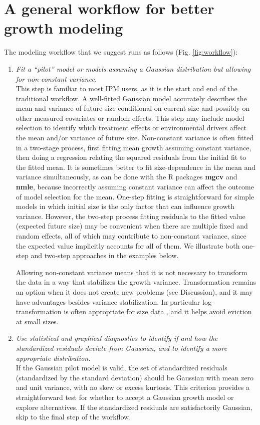 \documentclass[12pt]{article}
\begin{document}
\section*{A general workflow for better growth modeling}
The modeling workflow that we suggest runs as follows (Fig. \ref{fig:workflow}):
\begin{enumerate}[label=\arabic*., listparindent=1.5em]
\item \textit{Fit a ``pilot'' model or models assuming a Gaussian distribution but allowing for non-constant variance.}
\\ 
This step is familiar to most IPM users, as it is the start and end of the traditional workflow. 
A well-fitted Gaussian model accurately describes the mean and variance of future size conditional on current size and possibly on other measured covariates or random effects. 
This step may include model selection to identify which treatment effects or environmental drivers affect the mean and/or variance of future size. 
Non-constant variance is often fitted in a two-stage process, first fitting mean growth assuming constant variance, then doing a regression relating the squared residuals from the initial fit to the fitted mean. 
It is sometimes better to fit size-dependence in the mean and variance simultaneously, as can be done with the R packages \textbf{mgcv} and \textbf{nmle}, because incorrectly assuming constant variance can affect the outcome of model selection for the mean. 
One-step fitting is straightforward for simple models in which initial size is the only factor that can influence growth variance. 
However, the two-step process fitting residuals to the fitted value (expected future size) may be convenient when there are multiple fixed and random effects, all of which may contribute to non-constant variance, since the expected value implicitly accounts for all of them. 
We illustrate both one-step and two-step approaches in the examples below. 

Allowing non-constant variance means that it is not necessary to transform the data in a way that stabilizes the growth variance. 
Transformation remains an option when it does not create new problems (see Discussion), and it may have advantages besides variance stabilization. %
In particular log-transformation is often appropriate for size data \citep{ellner-etal-2016}, and it helps avoid eviction at small sizes. 

\item \textit{Use statistical and graphical diagnostics to identify if and how the standardized residuals deviate from Gaussian, and to identify a more appropriate distribution.}
\\
If the Gaussian pilot model is valid, the set of standardized residuals (standardized by the standard deviation) should be Gaussian with mean zero and unit variance, with no skew or excess kurtosis. 
This criterion provides a straightforward test for whether to accept a Gaussian growth model or explore alternatives. 
If the standardized residuals are satisfactorily Gaussian, skip to the final step of the workflow. 


\end{enumerate}
\end{document}
